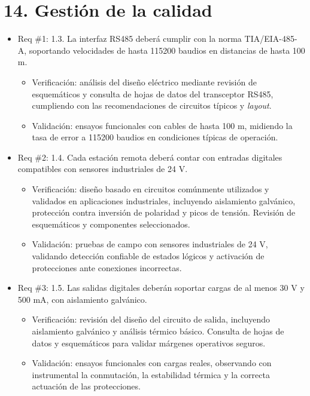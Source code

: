 \documentclass[
11pt, %
]{charter}
\begin{document}
\section{14. Gestión de la calidad}
\label{sec:calidad}

\begin{itemize}
	\item Req \#1: 1.3. La interfaz RS485 deberá cumplir con la norma TIA/EIA-485-A, soportando velocidades de hasta 115200 baudios en distancias de hasta 100 m.
	\begin{itemize}
		\item Verificación: análisis del diseño eléctrico mediante revisión de esquemáticos y consulta de hojas de datos del transceptor RS485, cumpliendo con las recomendaciones de circuitos típicos y \textit{layout}.
		\item Validación: ensayos funcionales con cables de hasta 100 m, midiendo la tasa de error a 115200 baudios en condiciones típicas de operación.
	\end{itemize}
	
	\item Req \#2: 1.4. Cada estación remota deberá contar con entradas digitales compatibles con sensores industriales de 24 V.
	\begin{itemize}
		\item Verificación: diseño basado en circuitos comúnmente utilizados y validados en aplicaciones industriales, incluyendo aislamiento galvánico, protección contra inversión de polaridad y picos de tensión. Revisión de esquemáticos y componentes seleccionados.
		\item Validación: pruebas de campo con sensores industriales de 24 V, validando detección confiable de estados lógicos y activación de protecciones ante conexiones incorrectas.
	\end{itemize}
	
	\item Req \#3: 1.5. Las salidas digitales deberán soportar cargas de al menos 30 V y 500 mA, con aislamiento galvánico.
	\begin{itemize}
		\item Verificación: revisión del diseño del circuito de salida, incluyendo aislamiento galvánico y análisis térmico básico. Consulta de hojas de datos y esquemáticos para validar márgenes operativos seguros.
		\item Validación: ensayos funcionales con cargas reales, observando con instrumental la conmutación, la estabilidad térmica y la correcta actuación de las protecciones.
	\end{itemize}
	

\end{itemize}
\end{document}
